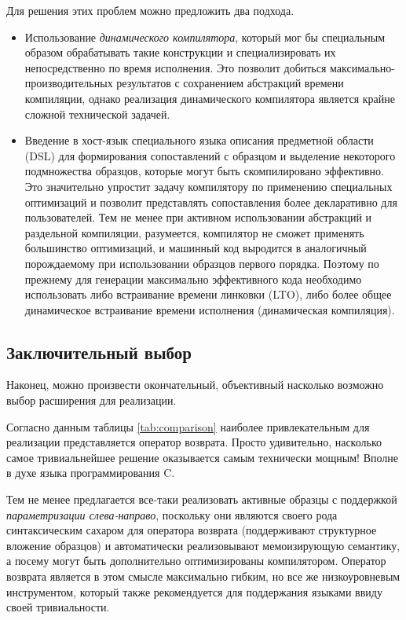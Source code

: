 Для решения этих проблем можно предложить два подхода.
\begin{itemize}
\item Использование \textit{динамического компилятора}, который мог бы специальным образом обрабатывать такие конструкции и специализировать их непосредственно по время исполнения. Это позволит добиться максимально-производительных результатов с сохранением абстракций времени компиляции, однако реализация динамического компилятора является крайне сложной технической задачей.
\item Введение в хост-язык специального языка описания предметной области (DSL) для формирования сопоставлений с образцом и выделение некоторого подмножества образцов, которые могут быть скомпилировано эффективно. Это значительно упростит задачу компилятору по применению специальных оптимизаций и позволит представлять сопоставления более декларативно для пользователей. Тем не менее при активном использовании абстракций и раздельной компиляции, разумеется, компилятор не сможет применять большинство оптимизаций, и машинный код выродится в аналогичный порождаемому при использовании образцов первого порядка. Поэтому по прежнему для генерации максимально эффективного кода необходимо использовать либо встраивание времени линковки (LTO), либо более общее динамическое встраивание времени исполнения (динамическая компиляция).
\end{itemize}

\subsection{Заключительный выбор} \label{sec:final_choice}

Наконец, можно произвести окончательный, объективный насколько возможно выбор расширения для реализации. 

Согласно данным таблицы \ref{tab:comparison} наиболее привлекательным для реализации представляется оператор возврата. Просто удивительно, насколько самое тривиальнейшее решение оказывается самым технически мощным! Вполне в духе языка программирования C.

Тем не менее предлагается все-таки реализовать активные образцы с поддержкой \textit{параметризации слева-направо}, поскольку они являются своего рода синтаксическим сахаром для оператора возврата (поддерживают структурное вложение образцов) и автоматически реализовывают мемоизирующую семантику, а посему могут быть дополнительно оптимизированы компилятором. Оператор возврата является в этом смысле максимально гибким, но все же низкоуровневым инструментом, который также рекомендуется для поддержания языками ввиду своей тривиальности.

